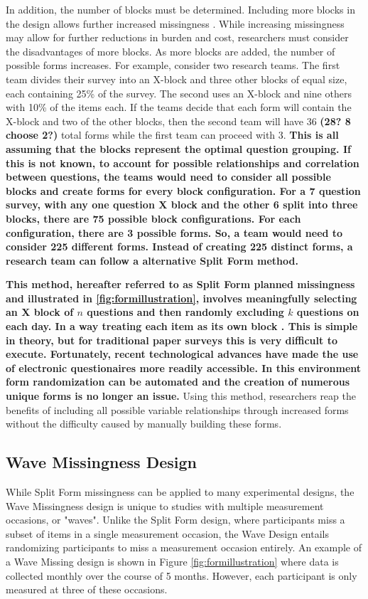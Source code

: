 \documentclass{svjour3}\usepackage[]{graphicx}\usepackage[]{color}
\begin{document}
In addition, the number of blocks must be determined. Including more blocks in the design allows further increased missingness \citep{graham2006planned}. While increasing missingness may allow for further reductions in burden and cost, researchers must consider the disadvantages of more blocks. As more blocks are added, the number of possible forms increases. For example, consider two research teams. The first team divides their survey into an X-block and three other blocks of equal size, each containing 25\% of the survey. The second uses an X-block and nine others with 10\% of the items each. If the teams decide that each form will contain the X-block and two of the other blocks, then the second team will have 36 \textbf{(28? 8 choose 2?)} total forms while the first team can proceed with 3. \textbf{This is all assuming that the blocks represent the optimal question grouping. If this is not known, to account for possible relationships and correlation between questions, the teams would need to consider all possible blocks and create forms for every block configuration. For a 7 question survey, with any one question X block and the other 6 split into three blocks, there are 75 possible block configurations. For each configuration, there are 3 possible forms. So, a team would need to consider 225 different forms. Instead of creating 225 distinct forms, a research team can follow a alternative Split Form method.} \par

\textbf{This method, hereafter referred to as Split Form planned missingness and illustrated in \ref{fig:formillustration}, involves meaningfully selecting an X block of $n$ questions and then randomly excluding $k$ questions on each day. In a way treating each item as its own block \citep{silvia2014planned}. This is simple in theory, but for traditional paper surveys this is very difficult to execute. Fortunately, recent technological advances have made the use of electronic questionaires more readily accessible. In this environment form randomization can be automated and the creation of numerous unique forms is no longer an issue.} Using this method, researchers reap the benefits of including all possible variable relationships through increased forms without the difficulty caused by manually building these forms. \par

\subsection{Wave Missingness Design}
\label{sec:1.2}
While Split Form missingness can be applied to many experimental designs, the Wave Missingness design \citep{little2013planned} is unique to studies with multiple measurement occasions, or "waves". Unlike the Split Form design, where participants miss a subset of items in a single measurement occasion, the Wave Design entails randomizing participants to miss a measurement occasion entirely. An example of a Wave Missing design is shown in Figure \ref{fig:formillustration} where data is collected monthly over the course of 5 months. However, each participant is only measured at three of these occasions. \par
\end{document}
